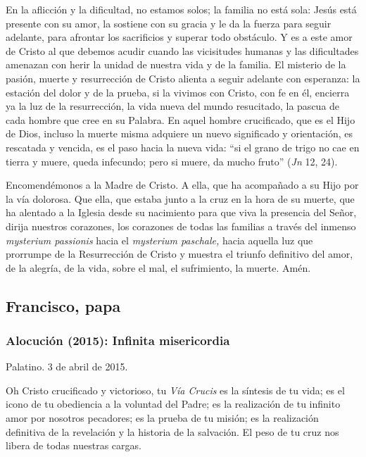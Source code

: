 			\begin{body}En la aflicción y la dificultad, no estamos solos; la familia no está sola: Jesús está presente con su amor, la sostiene con su gracia y le da la fuerza para seguir adelante, para afrontar los sacrificios y superar todo obstáculo. Y es a este amor de Cristo al que debemos acudir cuando las vicisitudes humanas y las dificultades amenazan con herir la unidad de nuestra vida y de la familia. El misterio de la pasión, muerte y resurrección de Cristo alienta a seguir adelante con esperanza: la estación del dolor y de la prueba, si la vivimos con Cristo, con fe en él, encierra ya la luz de la resurrección, la vida nueva del mundo resucitado, la pascua de cada hombre que cree en su Palabra. En aquel hombre crucificado, que es el Hijo de Dios, incluso la muerte misma adquiere un nuevo significado y orientación, es rescatada y vencida, es el paso hacia la nueva vida: “si el grano de trigo no cae en tierra y muere, queda infecundo; pero si muere, da mucho fruto” (\textit{Jn }12, 24). \end{body}
			
			\begin{body}Encomendémonos a la Madre de Cristo. A ella, que ha acompañado a su Hijo por la vía dolorosa. Que ella, que estaba junto a la cruz en la hora de su muerte, que ha alentado a la Iglesia desde su nacimiento para que viva la presencia del Señor, dirija nuestros corazones, los corazones de todas las familias a través del inmenso \textit{mysterium passionis }hacia el \textit{mysterium paschale, }hacia aquella luz que prorrumpe de la Resurrección de Cristo y muestra el triunfo definitivo del amor, de la alegría, de la vida, sobre el mal, el sufrimiento, la muerte. Amén.\end{body}
			
			\subsection{Francisco, papa}
			
			\subsubsection{Alocución (2015): Infinita misericordia}
			
			\begin{referencia}Palatino. 3 de abril de 2015.\end{referencia}
			
			\begin{body}Oh Cristo crucificado y victorioso, tu \textit{Vía Crucis} es la síntesis de tu vida; es el icono de tu obediencia a la voluntad del Padre; es la realización de tu infinito amor por nosotros pecadores; es la prueba de tu misión; es la realización definitiva de la revelación y la historia de la salvación. El peso de tu cruz nos libera de todas nuestras cargas. \end{body}
			
